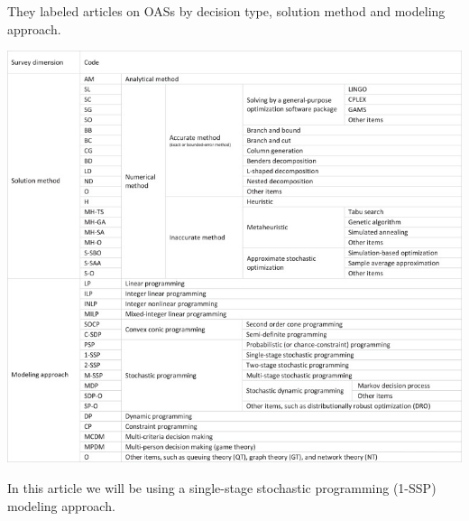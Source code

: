 \documentclass[
  10pt,
  letterpaper,
]{article}
\begin{document}
They labeled articles on OASs by decision type, solution method and
modeling approach.

\includegraphics{images/ahmadi2.jpeg}

In this article we will be using a single-stage stochastic programming
(1-SSP) modeling approach.
\end{document}
